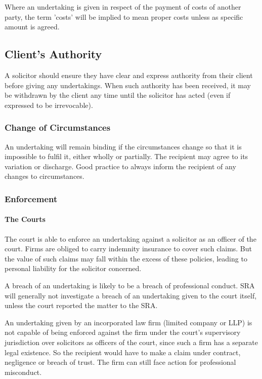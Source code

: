 \documentclass[
]{article}
\begin{document}
Where an undertaking is given in respect of the payment of costs of
another party, the term 'costs' will be implied to mean proper costs
unless as specific amount is agreed.

\hypertarget{clients-authority}{%
\subsection{Client's Authority}\label{clients-authority}}

A solicitor should ensure they have clear and express authority from
their client before giving any undertakings. When such authority has
been received, it may be withdrawn by the client any time until the
solicitor has acted (even if expressed to be irrevocable).

\hypertarget{change-of-circumstances}{%
\subsubsection{Change of Circumstances}\label{change-of-circumstances}}

An undertaking will remain binding if the circumstances change so that
it is impossible to fulfil it, either wholly or partially. The recipient
may agree to its variation or discharge. Good practice to always inform
the recipient of any changes to circumstances.

\hypertarget{enforcement}{%
\subsubsection{Enforcement}\label{enforcement}}

\hypertarget{the-courts}{%
\paragraph{The Courts}\label{the-courts}}

The court is able to enforce an undertaking against a solicitor as an
officer of the court. Firms are obliged to carry indemnity insurance to
cover such claims. But the value of such claims may fall within the
excess of these policies, leading to personal liability for the
solicitor concerned.

A breach of an undertaking is likely to be a breach of professional
conduct. SRA will generally not investigate a breach of an undertaking
given to the court itself, unless the court reported the matter to the
SRA.

An undertaking given by an incorporated law firm (limited company or
LLP) is not capable of being enforced against the firm under the court's
supervisory jurisdiction over solicitors as officers of the court, since
such a firm has a separate legal existence. So the recipient would have
to make a claim under contract, negligence or breach of trust. The firm
can still face action for professional misconduct.
\end{document}
